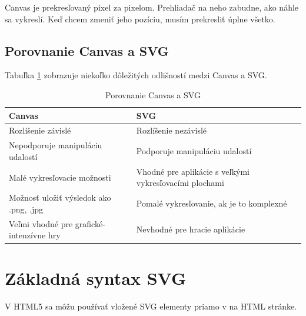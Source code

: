  
 Canvas je prekresľovaný pixel za pixelom. Prehliadač na neho zabudne, ako náhle sa vykreslí. Keď chcem zmeniť jeho pozíciu, musím prekresliť úplne všetko. 
 
 
 
 
 \subsection{Porovnanie Canvas a SVG}
 Tabuľka \ref{canvas:SVG} zobrazuje niekoľko dôležitých odlišností medzi Canvas a SVG. 
 
 \begin{table}[h]
 \centering
 \begin{tabular}{|l|p{7.5cm} |}
 	\hline Canvas & SVG \\
 	 	\hline Rozlíšenie závislé & Rozlíšenie nezávislé \\ 
 	\hline Nepodporuje manipuláciu udalostí & Podporuje manipuláciu udalostí \\ 
 	\hline Malé vykresľovacie možnosti & Vhodné pre aplikácie s veľkými vykresľovacími plochami \\ 
 	\hline Možnosť uložiť výsledok ako .png, .jpg & Pomalé vykresľovanie, ak je to komplexné \\ 
 	\hline Veľmi vhodné pre grafické-intenzívne hry & Nevhodné pre hracie aplikácie \\ 
 	\hline 
 \end{tabular} 

 \caption{Porovnanie Canvas a SVG}
 \label{canvas:SVG}
 
\end{table}
 
 
 \section{Základná syntax \acs*{SVG}}

V HTML5 sa môžu používať vložené SVG elementy priamo v na HTML stránke. 

